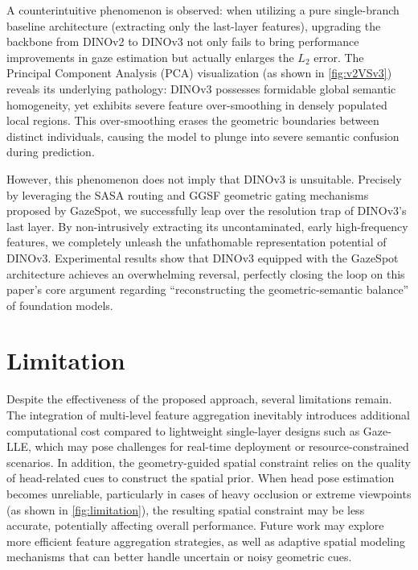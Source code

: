 \documentclass[sigconf,review,anonymous,screen]{acmart}
\begin{document}
A counterintuitive phenomenon is observed: when utilizing a pure single-branch baseline architecture (extracting only the last-layer features), upgrading the backbone from DINOv2 to DINOv3 not only fails to bring performance improvements in gaze estimation but actually enlarges the $L_2$ error. The Principal Component Analysis (PCA) visualization (as shown in \autoref{fig:v2VSv3}) reveals its underlying pathology: DINOv3 possesses formidable global semantic homogeneity, yet exhibits severe feature over-smoothing in densely populated local regions. This over-smoothing erases the geometric boundaries between distinct individuals, causing the model to plunge into severe semantic confusion during prediction.

However, this phenomenon does not imply that DINOv3 is unsuitable. Precisely by leveraging the SASA routing and GGSF geometric gating mechanisms proposed by GazeSpot, we successfully leap over the resolution trap of DINOv3's last layer. By non-intrusively extracting its uncontaminated, early high-frequency features, we completely unleash the unfathomable representation potential of DINOv3. Experimental results show that DINOv3 equipped with the GazeSpot architecture achieves an overwhelming reversal, perfectly closing the loop on this paper's core argument regarding ``reconstructing the geometric-semantic balance'' of foundation models.

\section{Limitation}
Despite the effectiveness of the proposed approach, several limitations remain. The integration of multi-level feature aggregation inevitably introduces additional computational cost compared to lightweight single-layer designs such as Gaze-LLE, which may pose challenges for real-time deployment or resource-constrained scenarios.
In addition, the geometry-guided spatial constraint relies on the quality of head-related cues to construct the spatial prior. When head pose estimation becomes unreliable, particularly in cases of heavy occlusion or extreme viewpoints (as shown in \autoref{fig:limitation}), the resulting spatial constraint may be less accurate, potentially affecting overall performance.
Future work may explore more efficient feature aggregation strategies, as well as adaptive spatial modeling mechanisms that can better handle uncertain or noisy geometric cues.
\end{document}
